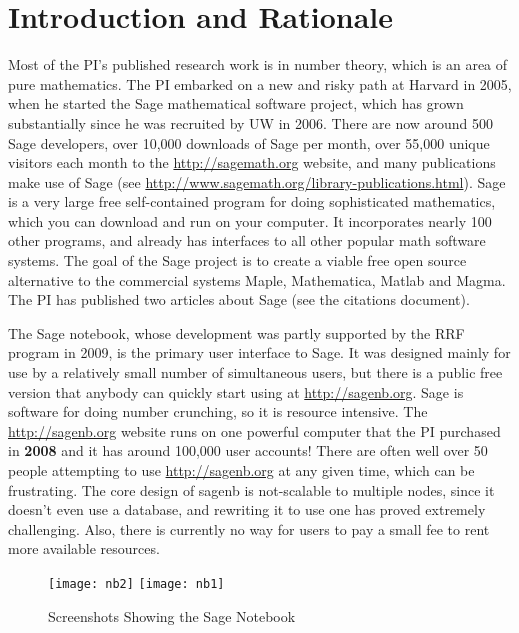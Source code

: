 \documentclass[11pt]{article}
\begin{document}
\section{Introduction and Rationale}


Most of the PI's published research work is in number theory, which is
an area of pure mathematics.  The PI embarked on a new and risky path
at Harvard in 2005, when he started the Sage mathematical software
project, which has grown substantially since he was recruited by UW in
2006.  There are now around 500 Sage developers, over 10,000 downloads
of Sage per month, over 55,000 unique visitors each month to the
\url{http://sagemath.org} website, and many publications make use of
Sage (see \url{http://www.sagemath.org/library-publications.html}).
Sage is a very large free
self-contained program for doing sophisticated mathematics, which you
can download and run on your computer.  It incorporates nearly 100
other programs, and already has interfaces to all other popular math
software systems.  The goal of the Sage project is to create a viable
free open source alternative to the commercial systems Maple,
Mathematica, Matlab and Magma.  The PI has published two articles
about Sage (see the citations document).

The Sage notebook, whose development was partly supported by the RRF
program in 2009, is the primary user interface to Sage.  It was
designed mainly for use by a relatively small number of simultaneous
users, but there is a public free version that anybody can quickly
start using at \url{http://sagenb.org}.  Sage is software for doing
number crunching, so it is resource intensive.  The
\url{http://sagenb.org} website runs on one powerful computer that the
PI purchased in {\bf 2008} and it has around 100,000 user accounts!
There are often well over 50 people attempting to use
\url{http://sagenb.org} at any given time, which can be frustrating.
The core design of sagenb is not-scalable to multiple nodes, since it
doesn't even use a database, and rewriting it to use one has proved
extremely challenging. Also, there is currently no way for users
to pay a small fee to rent more available resources.

\begin{center}
\begin{figure}[ht]
\hfill
\texttt{[image: nb2]}
\hfill
\texttt{[image: nb1]}
\hfill
\mbox{}
\caption{Screenshots Showing the Sage Notebook\label{fig:sagenb}}
\end{figure}
\end{center}
\end{document}
